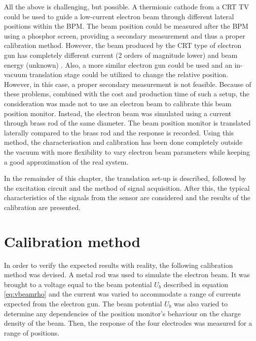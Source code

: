 All the above is challenging, but possible. A thermionic cathode from a CRT TV could be used to guide a low-current electron beam through different lateral positions within the BPM. The beam position could be measured after the BPM using a phosphor screen, providing a secondary measurement and thus a proper calibration method. However, the beam produced by the CRT type of electron gun has completely different current (2 orders of magnitude lower) and beam energy (unknown) .
Also, a more similar electron gun could be used and an in-vacuum translation stage could be utilized to change the relative position. However, in this case, a proper secondary measurement is not feasible.
Because of these problems, combined with the cost and production time of such a setup, the consideration was made not to use an electron beam to calibrate this beam position monitor. Instead, the electron beam was simulated using a current through brass rod of the same diameter.
The beam position monitor is translated laterally compared to the brass rod and the response is recorded. Using this method, the characterisation and calibration has been done completely outside the vacuum with more flexibility to vary electron beam parameters while keeping a good approximation of the real system. 

In the remainder of this chapter, the translation set-up is described, followed by the excitation circuit and the method of signal acquisition. After this, the typical characteristics of the signals from the sensor are considered and the results of the calibration are presented. 

\section{Calibration method}
In order to verify the expected results with reality, the following calibration method was devised. 
A metal rod was used to simulate the electron beam. It was brought to a voltage equal to the beam potential $U_b$ described in equation \ref{eq:vbeamrho} and the current was varied to accommodate a range of currents expected from the electron gun. %
The beam potential $U_b$ was also varied to determine any dependencies of the position monitor's behaviour on the charge density of the beam. Then, the response of the four electrodes was measured for a range of positions.

